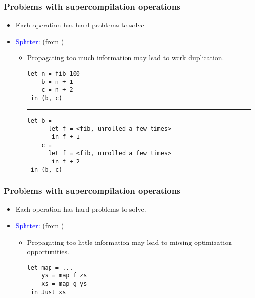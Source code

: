 \documentclass{beamer}
\begin{document}
\begin{frame}[fragile]
    \frametitle{Problems with supercompilation operations}

    \begin{itemize}[<+->]
        \item[]
            Each operation has hard problems to solve.

        \item[]
            \textcolor{blue}{Splitter:}
            (from \citet{callbyneed-sc})
            \begin{itemize}
                \item[]
                    Propagating too much information may lead to work
                    duplication.

                    \begin{verbatim}
let n = fib 100
    b = n + 1
    c = n + 2
 in (b, c)
                    \end{verbatim}
                    \noindent\rule{4cm}{0.4pt}
                    \bigskip
                    \begin{verbatim}
let b =
      let f = <fib, unrolled a few times>
       in f + 1
    c =
      let f = <fib, unrolled a few times>
       in f + 2
 in (b, c)
                    \end{verbatim}
            \end{itemize}
    \end{itemize}
\end{frame}

\begin{frame}[fragile]
    \frametitle{Problems with supercompilation operations}

    \begin{itemize}
        \item[]
            Each operation has hard problems to solve.

        \item[]
            \textcolor{blue}{Splitter:}
            (from \citet{callbyneed-sc})

            \begin{itemize}
                \item[]
                    Propagating too little information may lead to missing
                    optimization opportunities.
                    \begin{verbatim}
let map = ...
    ys = map f zs
    xs = map g ys
 in Just xs
                    \end{verbatim}
            \end{itemize}
    \end{itemize}
\end{frame}
\end{document}
